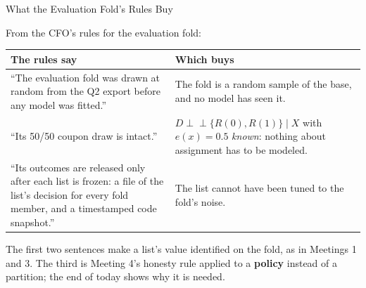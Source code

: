 \documentclass[aspectratio=169, 11pt, handout]{beamer}
\newcommand{\indep}{\perp\!\!\!\perp}
\begin{document}
\begin{frame}{What the Evaluation Fold's Rules Buy}

From the CFO's rules for the evaluation fold:

\begin{center}
\small
\begin{tabular}{p{6.4cm}p{6.6cm}}
\toprule
\textbf{The rules say} & \textbf{Which buys} \\
\midrule
``The evaluation fold was drawn at random from the Q2 export before any model was fitted.'' & The fold is a random sample of the base, and no model has seen it. \\[0.4em]
``Its 50/50 coupon draw is intact.'' & $D \indep \{R(0), R(1)\} \mid X$ with $e(x) = 0.5$ \emph{known}: nothing about assignment has to be modeled. \\[0.4em]
``Its outcomes are released only after each list is frozen: a file of the list's decision for every fold member, and a timestamped code snapshot.'' & The list cannot have been tuned to the fold's noise. \\
\bottomrule
\end{tabular}
\end{center}

\medskip

The first two sentences make a list's value identified on the fold, as in Meetings 1 and 3. The third is Meeting 4's honesty rule applied to a \textbf{policy} instead of a partition; the end of today shows why it is needed.
\end{frame}
\end{document}
